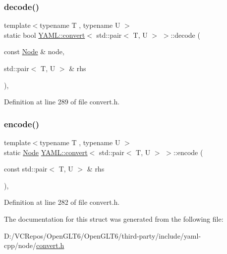 \subsubsection{\texorpdfstring{decode()}{decode()}}
{\footnotesize\ttfamily template$<$typename T , typename U $>$ \\
static bool \mbox{\hyperlink{struct_y_a_m_l_1_1convert}{Y\+A\+M\+L\+::convert}}$<$ std\+::pair$<$ T, U $>$ $>$\+::decode (\begin{DoxyParamCaption}\item[{const \mbox{\hyperlink{class_y_a_m_l_1_1_node}{Node}} \&}]{node,  }\item[{std\+::pair$<$ T, U $>$ \&}]{rhs }\end{DoxyParamCaption})\hspace{0.3cm}{\ttfamily [inline]}, {\ttfamily [static]}}



Definition at line 289 of file convert.\+h.

\mbox{\label{struct_y_a_m_l_1_1convert_3_01std_1_1pair_3_01_t_00_01_u_01_4_01_4_a9a8ca594f6cdb930d0d029377cf5d3d4}} 
\subsubsection{\texorpdfstring{encode()}{encode()}}
{\footnotesize\ttfamily template$<$typename T , typename U $>$ \\
static \mbox{\hyperlink{class_y_a_m_l_1_1_node}{Node}} \mbox{\hyperlink{struct_y_a_m_l_1_1convert}{Y\+A\+M\+L\+::convert}}$<$ std\+::pair$<$ T, U $>$ $>$\+::encode (\begin{DoxyParamCaption}\item[{const std\+::pair$<$ T, U $>$ \&}]{rhs }\end{DoxyParamCaption})\hspace{0.3cm}{\ttfamily [inline]}, {\ttfamily [static]}}



Definition at line 282 of file convert.\+h.



The documentation for this struct was generated from the following file\+:\begin{DoxyCompactItemize}
\item 
D\+:/\+V\+C\+Repos/\+Open\+G\+L\+T6/\+Open\+G\+L\+T6/third-\/party/include/yaml-\/cpp/node/\mbox{\hyperlink{convert_8h}{convert.\+h}}\end{DoxyCompactItemize}
